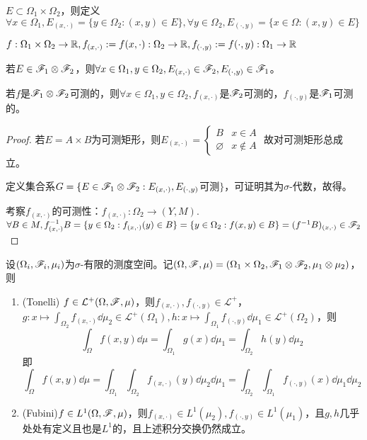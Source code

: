 \documentclass{ctexbook}
\begin{document}
\begin{Def}[截口(section)]
  $E\subset \Omega_{1}\times \Omega_{2}$，则定义$\forall x\in\Omega_{1}, E_{(x,\cdot)}=\{y\in\Omega_{2}:(x,y)\in E\},\forall y\in\Omega_{2},E_{(\cdot,y)}=\{x\in\Omega:(x,y)\in E\}$

  $f:\Omega_{1}\times\Omega_{2}\to\mathbb{R}, f_{(x,\cdot)}:=f(x,\cdot):\Omega_{2}\to\mathbb{R}, f_{(\cdot,y)}:=f(\cdot,y):\Omega_{1}\to\mathbb{R}$
\end{Def}

\begin{Prop}
  若$E\in\mathscr{F}_{1}\otimes\mathscr{F}_{2}$，则$\forall x\in\Omega_{1},y\in\Omega_{2}, E_{(x,\cdot)}\in\mathscr{F}_{2},E_{(\cdot,y)}\in\mathscr{F}_{1}$。

  若$f$是$\mathscr{F}_{1}\otimes\mathscr{F}_{2}$可测的，则$\forall x\in\Omega_{1},y\in\Omega_{2}, f_{(x,\cdot)}$是$\mathscr{F}_{2}$可测的，$f_{(\cdot,y)}$是$\mathscr{F}_{1}$可测的。
\end{Prop}

\begin{proof}
  若$E=A\times B$为可测矩形，则$E_{(x,\cdot)}=
  \begin{cases}
    B& x\in A\\ \varnothing & x\not\in A
  \end{cases}
  $
  故对可测矩形总成立。

  定义集合系$G=\{E\in\mathscr{F}_{1}\otimes\mathscr{F}_{2}: E_{(x,\cdot)}, E_{(\cdot,y)}$可测$\}$，可证明其为$\sigma$-代数，故得。

  考察$f_{(x,\cdot)}$的可测性：$f_{(x,\cdot)}:\Omega_{2}\to (Y,M)$. $\forall B\in M, f^{-1}_{(x,\cdot)}B=\{y\in\Omega_{2}:f_{(x,\cdot)}(y)\in B\}=\{y\in\Omega_{2}:f(x,y)\in B\}=(f^{-1}B)_{(x,\cdot)}\in \mathscr{F}_{2}$
  \end{proof}
  \begin{Thm}
  设$(\Omega_{i},\mathscr{F}_{i},\mu_{i})$为$\sigma$-有限的测度空间。记$(\Omega,\mathscr{F},\mu)=(\Omega_{1}\times\Omega_{2},\mathscr{F}_{1}\otimes\mathscr{F}_{2},\mu_{1}\otimes\mu_{2})$，则
    \begin{enumerate}
  \item (Tonelli) $f\in \mathcal{L}^{+}(\Omega,\mathscr{F},\mu)$，则$f_{(x,\cdot)}, f_{(\cdot,y)}\in\mathcal{L}^{+}$，$g:x\mapsto \int_{\Omega_{2}}f_{(x,\cdot)}\dd\mu_{2}\in \mathcal{L}^{+}(\Omega_{1}),h:x\mapsto \int_{\Omega_{1}}f_{(\cdot,y)}\dd\mu_{1}\in \mathcal{L}^{+}(\Omega_{2})$，则
    \[\int_{\Omega}f(x,y)\dd\mu=\int_{\Omega_{1}}g(x)\dd\mu_{1}=\int_{\Omega_{2}}h(y)\dd\mu_{2}\]
    即
    \[\int_{\Omega}f(x,y)\dd\mu
      =\int_{\Omega_{1}}\int_{\Omega_{2}}f_{(x,\cdot)}(y)\dd\mu_{2}\dd\mu_{1}
      =\int_{\Omega_{2}}\int_{\Omega_{1}}f_{(\cdot,y)}(x)\dd\mu_{1}\dd\mu_{2}
    \]
  \item (Fubini)$f\in L^{1}(\Omega,\mathscr{F},\mu)$，则$f_{(x,\cdot)}\in L^{1}(\mu_{2}), f_{(\cdot,y)}\in L^{1}(\mu_{1})$，且$g,h$几乎处处有定义且也是$L^{1}$的，且上述积分交换仍然成立。
  \end{enumerate}
  \end{Thm}
\end{document}
